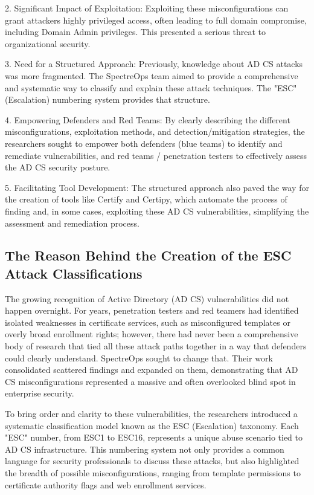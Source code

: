 {2. Significant Impact of Exploitation:
Exploiting these misconfigurations can grant attackers highly privileged access, often leading to full domain compromise, including Domain Admin privileges. This presented a serious threat to organizational security.

3. Need for a Structured Approach:
Previously, knowledge about AD CS attacks was more fragmented. The SpectreOps team aimed to provide a comprehensive and systematic way to classify and explain these attack techniques. The "ESC" (Escalation) numbering system provides that structure.

4. Empowering Defenders and Red Teams:
By clearly describing the different misconfigurations, exploitation methods, and detection/mitigation strategies, the researchers sought to empower both defenders (blue teams) to identify and remediate vulnerabilities, and red teams / penetration testers to effectively assess the AD CS security posture.

5. Facilitating Tool Development:
The structured approach also paved the way for the creation of tools like Certify and Certipy, which automate the process of finding and, in some cases, exploiting these AD CS vulnerabilities, simplifying the assessment and remediation process.

\subsection{The Reason Behind the Creation of the ESC Attack Classifications}
The growing recognition of Active Directory (AD CS) vulnerabilities did not happen overnight. For years, penetration testers and red teamers had identified isolated weaknesses in certificate services, such as misconfigured templates or overly broad enrollment rights; however, there had never been a comprehensive body of research that tied all these attack paths together in a way that defenders could clearly understand. SpectreOps sought to change that. Their work consolidated scattered findings and expanded on them, demonstrating that AD CS misconfigurations represented a massive and often overlooked blind spot in enterprise security.

To bring order and clarity to these vulnerabilities, the researchers introduced a systematic classification model known as the ESC (Escalation) taxonomy. Each "ESC" number, from ESC1 to ESC16, represents a unique abuse scenario tied to AD CS infrastructure. This numbering system not only provides a common language for security professionals to discuss these attacks, but also highlighted the breadth of possible misconfigurations, ranging from template permissions to certificate authority flags and web enrollment services.

}
